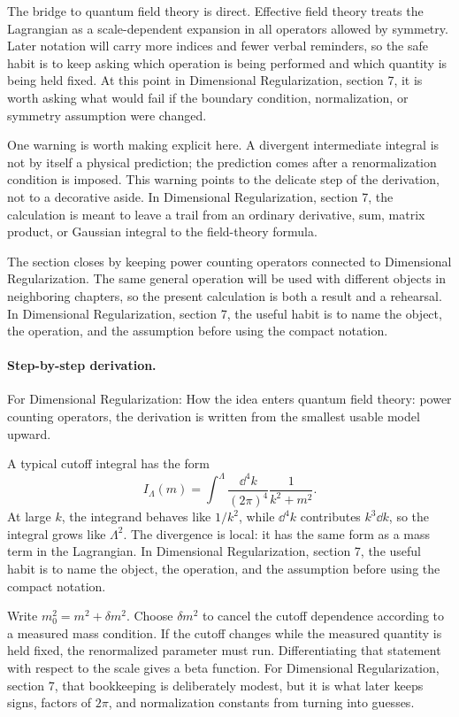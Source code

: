 The bridge to quantum field theory is direct.  Effective field theory treats the Lagrangian as a scale-dependent expansion in all operators allowed by symmetry.  Later notation will carry more indices and fewer verbal reminders, so the safe habit is to keep asking which operation is being performed and which quantity is being held fixed.  At this point in Dimensional Regularization, section 7, it is worth asking what would fail if the boundary condition, normalization, or symmetry assumption were changed.

One warning is worth making explicit here.  A divergent intermediate integral is not by itself a physical prediction; the prediction comes after a renormalization condition is imposed.  This warning points to the delicate step of the derivation, not to a decorative aside.  In Dimensional Regularization, section 7, the calculation is meant to leave a trail from an ordinary derivative, sum, matrix product, or Gaussian integral to the field-theory formula.

The section closes by keeping power counting operators connected to Dimensional Regularization.  The same general operation will be used with different objects in neighboring chapters, so the present calculation is both a result and a rehearsal.  In Dimensional Regularization, section 7, the useful habit is to name the object, the operation, and the assumption before using the compact notation.



\paragraph{Step-by-step derivation.}

For Dimensional Regularization: How the idea enters quantum field theory: power counting operators, the derivation is written from the smallest usable model upward.

A typical cutoff integral has the form
\[
  I_\Lambda(m)=\int^{\Lambda}\frac{\dd^4k}{(2\pi)^4}\frac{1}{k^2+m^2}.
\]
At large \(k\), the integrand behaves like \(1/k^2\), while \(\dd^4k\) contributes \(k^3\dd k\), so the integral grows like \(\Lambda^2\).  The divergence is local: it has the same form as a mass term in the Lagrangian.  In Dimensional Regularization, section 7, the useful habit is to name the object, the operation, and the assumption before using the compact notation.

Write \(m_0^2=m^2+\delta m^2\).  Choose \(\delta m^2\) to cancel the cutoff dependence according to a measured mass condition.  If the cutoff changes while the measured quantity is held fixed, the renormalized parameter must run.  Differentiating that statement with respect to the scale gives a beta function.  For Dimensional Regularization, section 7, that bookkeeping is deliberately modest, but it is what later keeps signs, factors of \(2\pi\), and normalization constants from turning into guesses.

